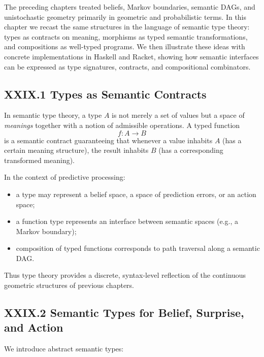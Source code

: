 \documentclass[12pt,letterpaper]{article}
\begin{document}
The preceding chapters treated beliefs, Markov boundaries, semantic DAGs, and unistochastic geometry primarily in geometric and probabilistic terms. In this chapter we recast the same structures in the language of semantic type theory: types as contracts on meaning, morphisms as typed semantic transformations, and compositions as well-typed programs. We then illustrate these ideas with concrete implementations in Haskell and Racket, showing how semantic interfaces can be expressed as type signatures, contracts, and compositional combinators.

\subsection{XXIX.1 Types as Semantic Contracts}

In semantic type theory, a type $A$ is not merely a set of values but a space of \emph{meanings} together with a notion of admissible operations. A typed function
\[
f : A \to B
\]
is a semantic contract guaranteeing that whenever a value inhabits $A$ (has a certain meaning structure), the result inhabits $B$ (has a corresponding transformed meaning).

In the context of predictive processing:

\begin{itemize}
  \item a type may represent a belief space, a space of prediction errors, or an action space;
  \item a function type represents an interface between semantic spaces (e.g., a Markov boundary);
  \item composition of typed functions corresponds to path traversal along a semantic DAG.
\end{itemize}

Thus type theory provides a discrete, syntax-level reflection of the continuous geometric structures of previous chapters.

\subsection{XXIX.2 Semantic Types for Belief, Surprise, and Action}

We introduce abstract semantic types:
\end{document}
